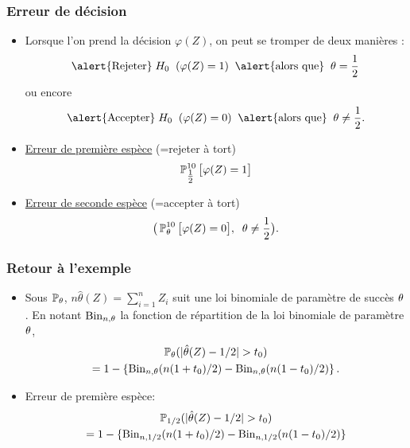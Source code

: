 \begin{frame}
\frametitle{Erreur de décision}
\begin{itemize}
\item
Lorsque l'on prend la décision $\varphi(Z)$, on peut se \alert{tromper de deux manières} :
$$\text{\alert{Rejeter}}\; H_0\;\;(\varphi(Z)=1)\;\;\text{\alert{alors que}}\;\;\truetheta = \frac{1}{2}$$
ou encore
$$\text{\alert{Accepter}}\;H_0\;\;(\varphi(Z)=0)\;\;\text{\alert{alors que}}\;\;\truetheta  \neq \frac{1}{2}.$$
\item \underline{Erreur de première espèce}  \alert{(=rejeter à tort)}
$$\operatorname{{\mathbb P}}_{\tfrac{1}{2}}^{10}\big[\varphi(Z)=1\big]$$
\item \underline{Erreur de seconde espèce}  \alert{(=accepter à tort)}
$$\big(\operatorname{{\mathbb P}}_\theta^{10}\big[\varphi(Z)=0\big],\;\;\theta \neq \frac{1}{2}\big).$$
\end{itemize}
\end{frame}


\begin{frame}
\frametitle{Retour à l'exemple}
\begin{itemize}
\item Sous $\operatorname{{\mathbb P}}_\theta$, $n \hat{\theta}(Z)= \sum_{i=1}^n Z_i$ suit une loi binomiale de paramètre de succès $\theta$.
En notant $\mathrm{Bin}_{n,\theta}$ la fonction
de répartition de la loi binomiale de paramètre $\theta$,
\begin{multline*}
\operatorname{{\mathbb P}}_\theta( |\hat{\theta}(Z) - 1/2| > t_0 ) \\
= 1 - \{\mathrm{Bin}_{n,\theta}(n(1+t_0)/2) - \mathrm{Bin}_{n,\theta}(n(1-t_0)/2)  \} \,.
\end{multline*}
\item \alert{Erreur de première espèce}:
\begin{multline*}
\operatorname{{\mathbb P}}_{1/2}(|\hat{\theta}(Z) - 1/2| > t_0) \\= 1 - \{ \mathrm{Bin}_{n,1/2}(n(1+t_0)/2) - \mathrm{Bin}_{n,1/2}(n(1-t_0)/2)  \}
\end{multline*}
\end{itemize}
\end{frame}


